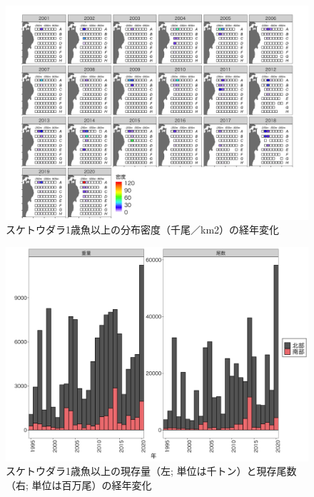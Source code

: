 \documentclass[11pt]{article} %
\begin{document}
\begin{linenumbers}
\begin{figure}[h]
  \centering
  \includegraphics[width = 14cm]{スケトウダラ１＋dens.png}
  \caption{スケトウダラ1歳魚以上の分布密度（千尾／km2）の経年変化}
\end{figure}

\begin{figure}[h]
  \centering
  \includegraphics[width = 14cm]{スケトウダラ１＋trend.png}
  \caption{スケトウダラ1歳魚以上の現存量（左; 単位は千トン）と現存尾数（右; 単位は百万尾）の経年変化}
\end{figure}


\end{linenumbers}
\end{document}
